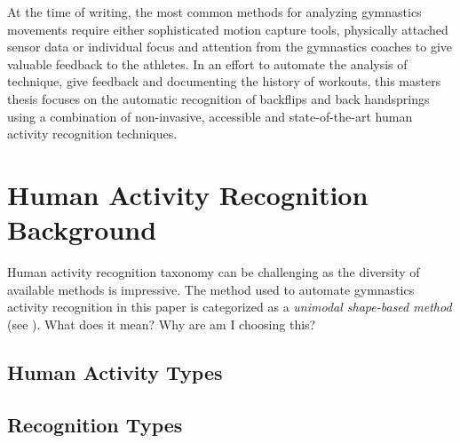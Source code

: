 At the time of writing, the most common methods for analyzing gymnastics movements require either sophisticated motion capture tools, physically attached sensor data or individual focus and attention from the gymnastics coaches to give valuable feedback to the athletes. In an effort to automate the analysis of technique, give feedback and documenting the history of workouts, this masters thesis focuses on the automatic recognition of backflips and back handsprings using a combination of non-invasive, accessible and state-of-the-art human activity recognition techniques.

\section{Human Activity Recognition Background}

Human activity recognition taxonomy can be challenging as the diversity of available methods is impressive. The method used to automate gymnastics activity recognition in this paper is categorized as a \textit{unimodal shape-based method} (see \cite{10.3389/frobt.2015.00028}). What does it mean? Why are am I choosing this?

\subsection{Human Activity Types}

\subsection{Recognition Types}









